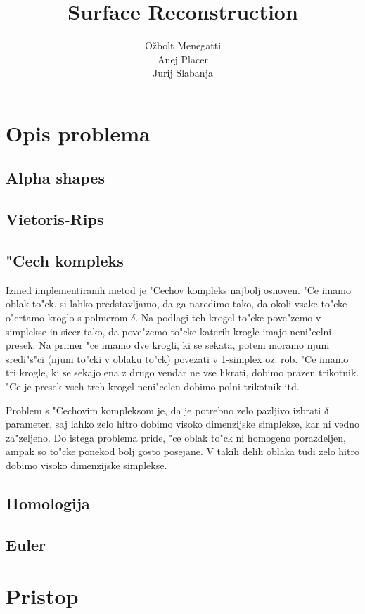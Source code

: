 \documentclass[11pt]{article}
\title{\textbf{Surface Reconstruction}}
\author{O\v zbolt Menegatti\\
		Anej Placer\\
		Jurij Slabanja}
\date{}
\begin{document}
\maketitle

\section{Opis problema}

\subsection{Alpha shapes}

\subsection{Vietoris-Rips}

\subsection{"Cech kompleks}
Izmed implementiranih metod je "Cechov kompleks najbolj osnoven. "Ce imamo oblak to"ck, si lahko predstavljamo, da ga naredimo tako, da okoli vsake to"cke o"crtamo kroglo s polmerom $\delta$. Na podlagi teh krogel to"cke pove"zemo v simplekse in sicer tako, da pove"zemo to"cke katerih krogle imajo neni"celni presek. Na primer "ce imamo dve krogli, ki se sekata, potem moramo njuni sredi"s"ci (njuni to"cki v oblaku to"ck) povezati v 1-simplex oz. rob. "Ce imamo tri krogle, ki se sekajo ena z drugo vendar ne vse hkrati, dobimo prazen trikotnik. "Ce je presek vseh treh krogel neni"celen dobimo polni trikotnik itd. 

Problem s "Cechovim kompleksom je, da je potrebno zelo pazljivo izbrati $\delta$ parameter, saj lahko zelo hitro dobimo visoko dimenzijske simplekse, kar ni vedno za"zeljeno. Do istega problema pride, "ce oblak to"ck ni homogeno porazdeljen, ampak so to"cke ponekod bolj gosto posejane. V takih delih oblaka tudi zelo hitro dobimo visoko dimenzijske simplekse.

\subsection{Homologija}

\subsection{Euler}

\section{Pristop}
\end{document}
